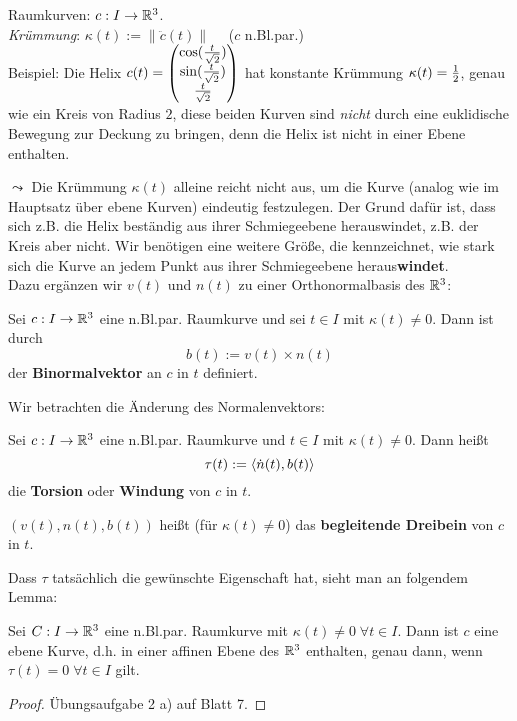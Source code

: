\documentclass[11pt]{scrbook}
\newcommand{\kp}{\times} 	 		%
\begin{document}
\setcounter{thm}{3}

Raumkurven: $c: I \to \mathbb{R}^3$. \\
\emph{Krümmung}: $\kappa(t) := \| \ddot c(t) \| \quad$ ($c$ n.Bl.par.) \\
Beispiel: Die Helix $c(t) = \begin{pmatrix} \cos(\frac{t}{\sqrt{2}}) \\ \sin(\frac{t}{\sqrt{2}}) \\ \frac{t}{\sqrt{2}} \end{pmatrix}$  hat konstante Krümmung $\kappa(t) = \frac{1}{2}$, genau wie ein Kreis von Radius $2$, diese beiden Kurven sind \emph{nicht} durch eine euklidische Bewegung zur Deckung zu bringen, denn die Helix ist nicht in einer Ebene enthalten. 

$\leadsto$ Die Krümmung $\kappa(t)$ alleine reicht nicht aus, um die Kurve (analog wie im Hauptsatz über ebene Kurven) eindeutig festzulegen. Der Grund dafür ist, dass sich z.B. die Helix beständig aus ihrer Schmiegeebene herauswindet, z.B. der Kreis aber nicht. Wir benötigen eine weitere Größe, die kennzeichnet, wie stark sich die Kurve an jedem Punkt aus ihrer Schmiegeebene heraus\textbf{windet}. \\
Dazu ergänzen wir $v(t)$ und $n(t)$ zu einer Orthonormalbasis des $\mathbb{R}^3$:

\begin{df}
Sei $c: I \to \mathbb{R}^3$ eine n.Bl.par. Raumkurve und sei $t \in I$ mit $\kappa(t) \neq 0$. Dann ist durch
\[ b(t) := v(t) \kp n(t) \]
der \textbf{Binormalvektor} an $c$ in $t$ definiert.
\end{df}

Wir betrachten die Änderung des Normalenvektors:
\begin{df}
Sei $c: I \to \mathbb{R}^3$ eine n.Bl.par. Raumkurve und $t \in I$ mit $\kappa(t) \neq 0$. Dann heißt
\[ \tau(t) := \langle \dot n(t), b(t) \rangle \]
die \textbf{Torsion} oder \textbf{Windung} von $c$ in $t$.
\end{df}

\begin{note*}
$\left( v(t), n(t), b(t) \right)$ heißt (für $\kappa(t) \neq 0$) das \textbf{begleitende Dreibein} von $c$ in $t$.
\end{note*}

Dass $\tau$ tatsächlich die gewünschte Eigenschaft hat, sieht man an folgendem Lemma:
\begin{lem}
Sei $C: I  \to \mathbb{R}^3$ eine n.Bl.par. Raumkurve mit $\kappa(t) \neq 0 \; \forall t \in I$. Dann ist $c$ eine ebene Kurve, d.h. in einer affinen Ebene des $\mathbb{R}^3$ enthalten, genau dann, wenn $\tau(t) = 0 \; \forall t \in I$ gilt.
\begin{proof}
Übungsaufgabe 2 a) auf Blatt 7.
\end{proof} 
\end{lem}
\end{document}
